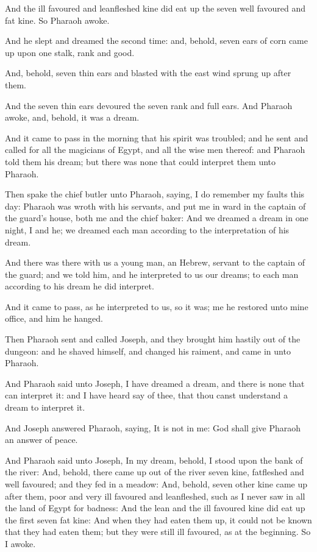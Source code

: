 \verse And the ill favoured and leanfleshed kine did eat up the seven well favoured and fat kine. So Pharaoh awoke.

\verse And he slept and dreamed the second time: and, behold, seven ears of corn came up upon one stalk, rank and good.

\verse And, behold, seven thin ears and blasted with the east wind sprung up after them.

\verse And the seven thin ears devoured the seven rank and full ears.  And Pharaoh awoke, and, behold, it was a dream.

\verse And it came to pass in the morning that his spirit was troubled; and he sent and called for all the magicians of Egypt, and all the wise men thereof: and Pharaoh told them his dream; but there was none that could interpret them unto Pharaoh.

\verse Then spake the chief butler unto Pharaoh, saying, I do remember my faults this day: \verse Pharaoh was wroth with his servants, and put me in ward in the captain of the guard's house, both me and the chief baker: \verse And we dreamed a dream in one night, I and he; we dreamed each man according to the interpretation of his dream.

\verse And there was there with us a young man, an Hebrew, servant to the captain of the guard; and we told him, and he interpreted to us our dreams; to each man according to his dream he did interpret.

\verse And it came to pass, as he interpreted to us, so it was; me he restored unto mine office, and him he hanged.

\verse Then Pharaoh sent and called Joseph, and they brought him hastily out of the dungeon: and he shaved himself, and changed his raiment, and came in unto Pharaoh.

\verse And Pharaoh said unto Joseph, I have dreamed a dream, and there is none that can interpret it: and I have heard say of thee, that thou canst understand a dream to interpret it.

\verse And Joseph answered Pharaoh, saying, It is not in me: God shall give Pharaoh an answer of peace.

\verse And Pharaoh said unto Joseph, In my dream, behold, I stood upon the bank of the river: \verse And, behold, there came up out of the river seven kine, fatfleshed and well favoured; and they fed in a meadow: \verse And, behold, seven other kine came up after them, poor and very ill favoured and leanfleshed, such as I never saw in all the land of Egypt for badness: \verse And the lean and the ill favoured kine did eat up the first seven fat kine: \verse And when they had eaten them up, it could not be known that they had eaten them; but they were still ill favoured, as at the beginning. So I awoke.

